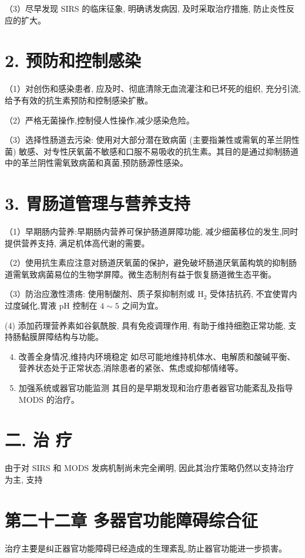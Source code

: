 \documentclass[10pt]{article}
\begin{document}
（3）尽早发现 SIRS 的临床征象, 明确诱发病因, 及时采取治疗措施, 防止炎性反应的扩大。

\section*{2. 预防和控制感染}
（1）对创伤和感染患者, 应及时、彻底清除无血流灌注和已坏死的组织, 充分引流, 给予有效的抗生素预防和控制感染扩散。

（2）严格无菌操作,控制侵人性操作,减少感染危险。

（3）选择性肠道去污染: 使用对大部分潜在致病菌 (主要指兼性或需氧的革兰阴性菌) 敏感、对专性厌氧菌不敏感和口服不易吸收的抗生素。其目的是通过抑制肠道中的革兰阴性需氧致病菌和真菌,预防肠源性感染。

\section*{3. 胃肠道管理与营养支持}
（1）早期肠内营养:早期肠内营养可保护肠道屏障功能, 减少细菌移位的发生,同时提供营养支持, 满足机体高代谢的需要。

（2）使用抗生素应注意对肠道厌氧菌的保护，避免破坏肠道厌氧菌构筑的抑制肠道需氧致病菌易位的生物学屏障。微生态制剂有益于恢复肠道微生态平衡。

（3）防治应激性溃疡: 使用制酸剂、质子泵抑制剂或 $\mathrm{H}_{2}$ 受体拮抗药, 不宜使胃内过度碱化,胃液 $\mathrm{pH}$ 控制在 $4 \sim 5$ 之间为宜。

(4) 添加药理营养素如谷氨酰胺, 具有免疫调理作用, 有助于维持细胞正常功能, 支持肠黏膜屏障结构与功能。

\begin{enumerate}
  \setcounter{enumi}{3}
  \item 改善全身情况,维持内环境稳定 如尽可能地维持机体水、电解质和酸碱平衡、营养状态处于正常状态,消除患者的紧张、焦虑或抑郁情绪等。

  \item 加强系统或器官功能监测 其目的是早期发现和治疗患者器官功能紊乱及指导 MODS 的治疗。

\end{enumerate}

\section*{二. 治 疗}
由于对 SIRS 和 MODS 发病机制尚未完全阐明, 因此其治疗策略仍然以支持治疗为主, 支持

\section*{第二十二章 多器官功能障碍综合征}
治疗主要是纠正器官功能障碍已经造成的生理紊乱,防止器官功能进一步损害。
\end{document}
